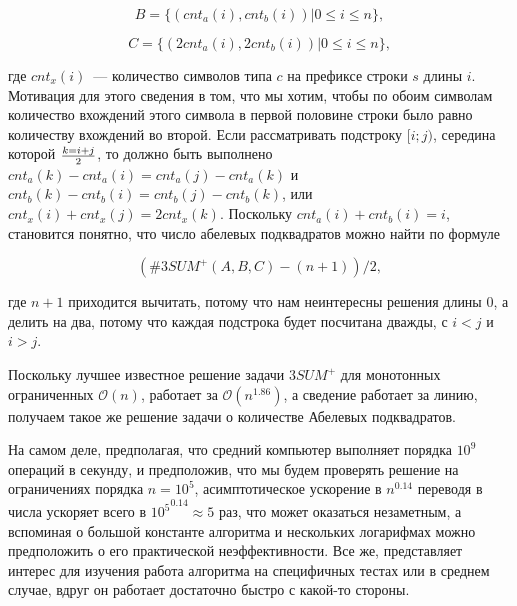 \begin{equation}
B = \{ (cnt_a(i), cnt_b(i)) | 0 \le i \le n \},
\end{equation}

\begin{equation}
C = \{ (2cnt_a(i), 2cnt_b(i)) | 0 \le i \le n \},
\end{equation}


где $cnt_x(i)$~--- количество символов типа $c$ на префиксе строки $s$ длины $i$. Мотивация для этого сведения в том, что мы хотим, чтобы по обоим символам количество вхождений этого символа в первой половине строки было равно количеству вхождений во второй. Если рассматривать подстроку $[i; j)$, середина которой $k={i+j} \over 2$, то должно быть выполнено $cnt_a(k)-cnt_a(i)=cnt_a(j)-cnt_a(k)$ и $cnt_b(k)-cnt_b(i)=cnt_b(j)-cnt_b(k)$, или $cnt_x(i)+cnt_x(j)=2cnt_x(k)$. Поскольку $cnt_a(i)+cnt_b(i)=i$, становится понятно, что число абелевых подквадратов можно найти по формуле 

\begin{equation}
(\#3SUM^+(A, B, C) - (n+1)) / 2,
\end{equation}

где $n+1$ приходится вычитать, потому что нам неинтересны решения длины 0, а делить на два, потому что каждая подстрока будет посчитана дважды, с $i<j$ и $i>j$.

Поскольку лучшее известное решение задачи $3SUM^+$ для монотонных ограниченных $\mathcal{O}(n)$, работает за $\mathcal{O}(n^{1.86})$, а сведение работает за линию, получаем такое же решение задачи о количестве Абелевых подквадратов.

На самом деле, предполагая, что средний компьютер выполняет порядка $10^9$ операций в секунду, и предположив, что мы будем проверять решение на ограничениях порядка $n=10^5$, асимптотическое ускорение в $n^{0.14}$ переводя в числа ускоряет всего в ${10^5}^{0.14} \approx 5$ раз, что может оказаться незаметным, а вспоминая о большой константе алгоритма и нескольких логарифмах можно предположить о его практической неэффективности. Все же, представляет интерес для изучения работа алгоритма на специфичных тестах или в среднем случае, вдруг он работает достаточно быстро с какой-то стороны.

